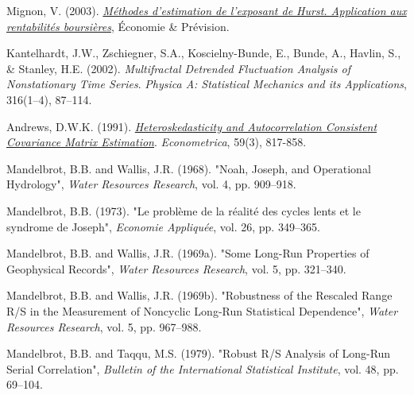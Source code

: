 \documentclass[11pt]{extarticle}
\begin{document}
Mignon, V. (2003). \textit{\href{https://www.persee.fr/doc/ecop_0249-4744_1998_num_132_1_5909}{Méthodes d'estimation de l'exposant de Hurst. Application aux rentabilités boursières}}, Économie \& Prévision.

Kantelhardt, J.W., Zschiegner, S.A., Koscielny-Bunde, E., Bunde, A., Havlin, S., \& Stanley, H.E. (2002). \textit{Multifractal Detrended Fluctuation Analysis of Nonstationary Time Series}. \textit{Physica A: Statistical Mechanics and its Applications}, 316(1--4), 87--114.

Andrews, D.W.K. (1991). \textit{\href{https://www.jstor.org/stable/2938229}{Heteroskedasticity and Autocorrelation Consistent Covariance Matrix Estimation}}. \textit{Econometrica}, 59(3), 817-858.

Mandelbrot, B.B. and Wallis, J.R. (1968). "Noah, Joseph, and Operational Hydrology", \textit{Water Resources Research}, vol. 4, pp. 909--918.

Mandelbrot, B.B. (1973). "Le problème de la réalité des cycles lents et le syndrome de Joseph", \textit{Economie Appliquée}, vol. 26, pp. 349--365.

Mandelbrot, B.B. and Wallis, J.R. (1969a). "Some Long-Run Properties of Geophysical Records", \textit{Water Resources Research}, vol. 5, pp. 321--340.

Mandelbrot, B.B. and Wallis, J.R. (1969b). "Robustness of the Rescaled Range R/S in the Measurement of Noncyclic Long-Run Statistical Dependence", \textit{Water Resources Research}, vol. 5, pp. 967--988.

Mandelbrot, B.B. and Taqqu, M.S. (1979). "Robust R/S Analysis of Long-Run Serial Correlation", \textit{Bulletin of the International Statistical Institute}, vol. 48, pp. 69--104.
\end{document}
